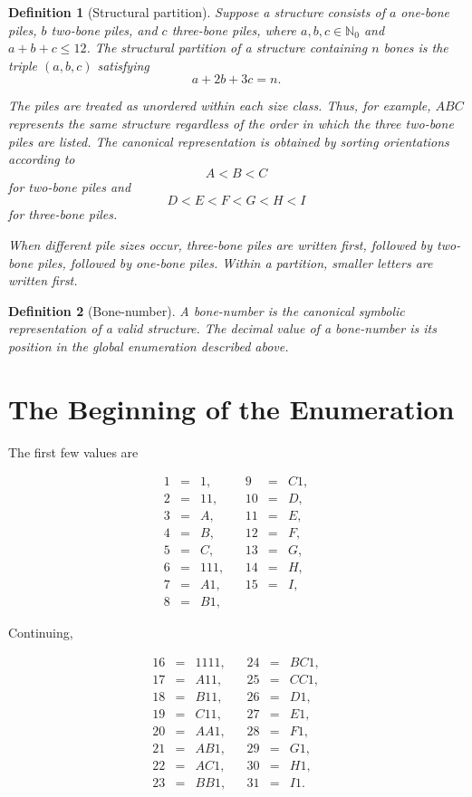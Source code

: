 \documentclass[11pt]{article}
\newtheorem{definition}{Definition}[section]
\theoremstyle{remark}
\begin{document}
\begin{definition}[Structural partition]
Suppose a structure consists of \(a\) one-bone piles, \(b\) two-bone piles, and \(c\) three-bone piles, where \(a,b,c\in\mathbb{N}_0\) and \(a+b+c\leq 12\). The \emph{structural partition} of a structure containing \(n\) bones is the triple \((a,b,c)\) satisfying
\[
	a+2b+3c=n.
\]

The piles are treated as unordered within each size class. Thus, for example, \(ABC\) represents the same structure regardless of the order in which the three two-bone piles are listed. The canonical representation is obtained by sorting orientations according to
\[
A<B<C
\]
for two-bone piles and
\[
D<E<F<G<H<I
\]
for three-bone piles.

\bigskip
When different pile sizes occur, three-bone piles are written first, followed by two-bone piles, followed by one-bone piles. Within a partition, smaller letters are written first.\end{definition}

\begin{definition}[Bone-number]
A \emph{bone-number} is the canonical symbolic representation of a valid structure. The decimal value of a bone-number is its position in the global enumeration described above.
\end{definition}

\newpage
\section{The Beginning of the Enumeration}

The first few values are

\[
\begin{array}{rclcrcl}
1&=&1,	&& 9&=&C1,\\
2&=&11,	&& 10&=&D,\\
3&=&A,	&& 11&=&E,\\
4&=&B,	&& 12&=&F,\\
5&=&C,	&& 13&=&G,\\
6&=&111,	&& 14&=&H,\\
7&=&A1,	&& 15&=&I,\\
8&=&B1,	&&
\end{array}
\]

Continuing,

\[
\begin{array}{rclcrcl}
16&=&1111, && 24&=&BC1,\\
17&=&A11,  && 25&=&CC1,\\
18&=&B11,  && 26&=&D1,\\
19&=&C11,  && 27&=&E1,\\
20&=&AA1,  && 28&=&F1,\\
21&=&AB1,  && 29&=&G1,\\
22&=&AC1,  && 30&=&H1,\\
23&=&BB1,  && 31&=&I1.
\end{array}
\]
\end{document}
